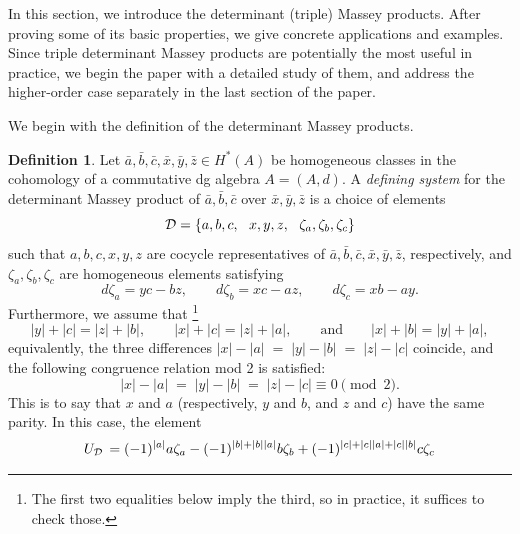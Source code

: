 \documentclass[11pt]{article}
\theoremstyle{definition}
\theoremstyle{definition}
\newtheorem{definition}[theorem]{Definition}
\begin{document}
In this section, we introduce the determinant (triple) Massey products.
After proving some of its basic properties, we give concrete applications and examples.
Since triple determinant Massey products are potentially the most useful in practice,
we begin the paper with a detailed study of them, and address the higher-order case separately in the last section of the paper.


\smallskip

We begin with the definition of the determinant Massey products.

\begin{definition}
\label{def: determinant Massey product}
Let $\bar a,\bar b,\bar c,\bar x,\bar y, \bar z\in H^*(A)$ be homogeneous classes in the cohomology of a commutative 
dg algebra $A=\left(A,d\right)$.
A \emph{defining system} for the determinant Massey product of
$\bar a, \bar b, \bar c$ over $\bar x,\bar y,\bar z$
is a choice of elements 
\begin{equation*}
\mathcal D = \left\{a,b,c,\ \ x,y,z,\ \ \zeta_a,\zeta_b,\zeta_c\right\}
\end{equation*}
such that $a,b,c,x,y,z$ are cocycle representatives of $\bar a, \bar b, \bar c, \bar x,\bar y, \bar z$, respectively,
and $\zeta_a,\zeta_b,\zeta_c$ are homogeneous elements satisfying
\begin{equation*}
    \label{ecu: bounding assumptions}
    d\zeta_a=yc-bz, \quad \quad 
d\zeta_b=xc-az, \quad \quad 
d\zeta_c=xb-ay.
\end{equation*}
Furthermore, we assume that
\footnote{The first two equalities below imply the third, so in practice,
it suffices to check those.}
\begin{equation*}
|y|+|c| = |z|+|b|, \qquad |x|+|c| = |z| + |a|,
\qquad \textrm{and} \qquad |x|+|b|=|y|+|a|,
\end{equation*}
equivalently, the three differences $|x|-|a| \;=\; |y|-|b| \;=\; |z|-|c|$ coincide,
and the following congruence relation mod 2 is satisfied:
\begin{equation*}
|x|-|a| \;=\; |y|-|b| \;=\; |z|-|c| \equiv 0 \pmod 2.
\end{equation*}
This is to say that $x$ and $a$ (respectively, $y$ and $b$, and $z$ and $c$) have the same parity.
In this case, the element 
\begin{equation}
    \label{ecu: determinant Massey product cocycle}
    U_{\mathcal D} \,=
    (-1)^{|a|}a\zeta_a - (-1)^{|b| + |b||a|}b \zeta_b + (-1)^{|c|+ |c||a| + |c||b| }c\zeta_c
\end{equation}

\end{definition}
\end{document}
